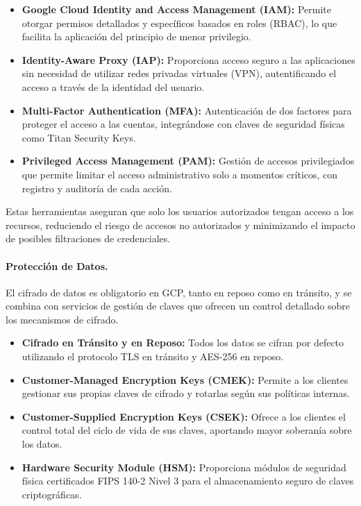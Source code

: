 {                \begin{itemize}
                    \item \textbf{Google Cloud Identity and Access Management (IAM):} Permite otorgar permisos detallados y específicos basados en roles (RBAC), lo que facilita la aplicación del principio de menor privilegio.
                    \item \textbf{Identity-Aware Proxy (IAP):} Proporciona acceso seguro a las aplicaciones sin necesidad de utilizar redes privadas virtuales (VPN), autentificando el acceso a través de la identidad del usuario.
                    \item \textbf{Multi-Factor Authentication (MFA):} Autenticación de dos factores para proteger el acceso a las cuentas, integrándose con claves de seguridad físicas como Titan Security Keys.
                    \item \textbf{Privileged Access Management (PAM):} Gestión de accesos privilegiados que permite limitar el acceso administrativo solo a momentos críticos, con registro y auditoría de cada acción.
                \end{itemize}
            
                Estas herramientas aseguran que solo los usuarios autorizados tengan acceso a los recursos, reduciendo el riesgo de accesos no autorizados y minimizando el impacto de posibles filtraciones de credenciales.
            
                \paragraph{Protección de Datos.}
                El cifrado de datos es obligatorio en GCP, tanto en reposo como en tránsito, y se combina con servicios de gestión de claves que ofrecen un control detallado sobre los mecanismos de cifrado.
            
                \begin{itemize}
                    \item \textbf{Cifrado en Tránsito y en Reposo:} Todos los datos se cifran por defecto utilizando el protocolo TLS en tránsito y AES-256 en reposo.
                    \item \textbf{Customer-Managed Encryption Keys (CMEK):} Permite a los clientes gestionar sus propias claves de cifrado y rotarlas según sus políticas internas.
                    \item \textbf{Customer-Supplied Encryption Keys (CSEK):} Ofrece a los clientes el control total del ciclo de vida de sus claves, aportando mayor soberanía sobre los datos. 
                    \item \textbf{Hardware Security Module (HSM):} Proporciona módulos de seguridad física certificados FIPS 140-2 Nivel 3 para el almacenamiento seguro de claves criptográficas.
                \end{itemize}
            
}
